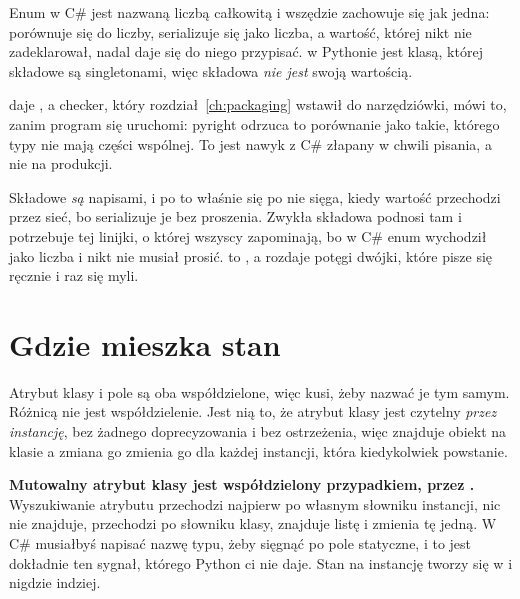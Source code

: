 Enum w C\# jest nazwaną liczbą całkowitą i wszędzie zachowuje się jak
jedna: porównuje się do liczby, serializuje się jako liczba, a wartość,
której nikt nie zadeklarował, nadal daje się do niego przypisać.
 w Pythonie jest klasą, której składowe są singletonami, więc
składowa \emph{nie jest} swoją wartością.



\noindent
{} daje , a checker, który
rozdział~\ref{ch:packaging} wstawił do narzędziówki, mówi to, zanim
program się uruchomi: pyright odrzuca to porównanie jako takie, którego
typy nie mają części wspólnej. To jest nawyk z C\# złapany w chwili
pisania, a nie na produkcji.

Składowe  \emph{są} napisami, i po to właśnie się po nie
sięga, kiedy wartość przechodzi przez sieć, bo 
serializuje je bez proszenia. Zwykła składowa  podnosi tam
 i potrzebuje  \dash{} tej linijki, o której
wszyscy zapominają, bo w C\# enum wychodził jako liczba i nikt nie musiał
prosić.  to \code{[Flags]}, a  rozdaje potęgi
dwójki, które pisze się ręcznie i raz się myli.

\section{Gdzie mieszka stan}
\label{sec:ch04-state}

Atrybut klasy i pole  są oba współdzielone, więc kusi, żeby
nazwać je tym samym. Różnicą nie jest współdzielenie. Jest nią to, że
atrybut klasy jest czytelny \emph{przez instancję}, bez żadnego
doprecyzowania i bez ostrzeżenia, więc  znajduje obiekt na
klasie \dash{} a zmiana go zmienia go dla każdej instancji, która
kiedykolwiek powstanie.




\begin{trapbox}
\textbf{Mutowalny atrybut klasy jest współdzielony przypadkiem, przez
.} Wyszukiwanie atrybutu przechodzi najpierw po własnym
słowniku instancji, nic nie znajduje, przechodzi po słowniku klasy,
znajduje listę i zmienia tę jedną. W C\# musiałbyś napisać nazwę typu,
żeby sięgnąć po pole statyczne, i to jest dokładnie ten sygnał, którego
Python ci nie daje. Stan na instancję tworzy się w  i
nigdzie indziej.
\end{trapbox}

